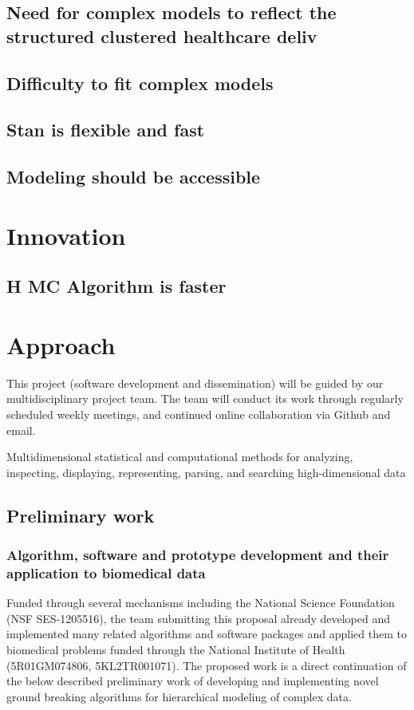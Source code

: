 \documentclass[11pt,notitlepage]{article}
\begin{document}
\subsection*{Need for complex models to reflect the structured clustered healthcare deliv}

\subsection*{Difficulty to fit complex models}

\subsection*{Stan is flexible and fast}

\subsection*{Modeling should be accessible}

\section*{Innovation}

\subsection*{H MC Algorithm is faster}

\section*{Approach}
This project (software development and dissemination) will be guided by our multidisciplinary project team. The team will conduct its work through regularly scheduled weekly meetings, and continued online collaboration via Github and email. 

Multidimensional statistical and computational methods for analyzing, inspecting, displaying, representing, parsing, and searching high-dimensional data

\subsection*{Preliminary work}

  

\subsubsection*{Algorithm, software and prototype development and their application to biomedical data}
Funded through several mechanisms including the National Science Foundation (NSF SES-1205516), the team submitting this proposal already developed and implemented many related algorithms and software packages and applied them to biomedical problems funded through the National Institute of Health (5R01GM074806, 5KL2TR001071). The proposed work is a direct continuation of the below described preliminary work of developing and implementing novel ground breaking algorithms for hierarchical modeling of complex data.
\end{document}
